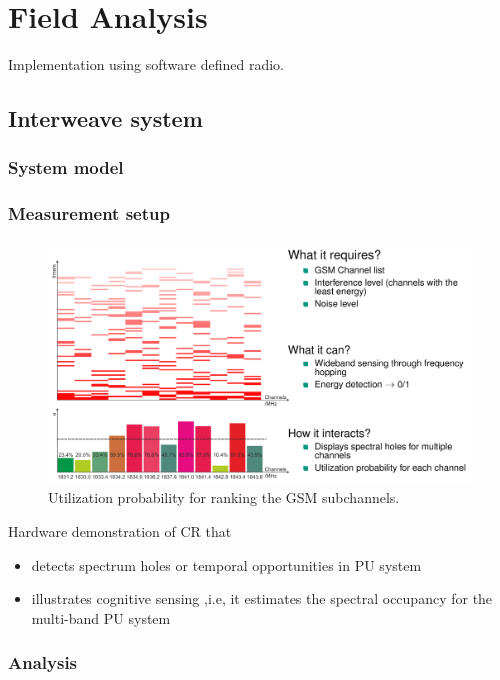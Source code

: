 \chapter{Field Analysis}
\label{chap:Field}
Implementation using software defined radio.
\section{Interweave system}

\subsection{System model}

\subsection{Measurement setup}
\begin{figure}[!t]
        \centering
        \includegraphics[trim=0.0cm 0.0cm 5.28cm 0.0cm,clip=true,width=\columnwidth]{../kapitel05/figures/Interweave_GUI.png}
        \caption{Utilization probability for ranking the GSM subchannels.}
        \label{fig:uti}
\end{figure}
Hardware demonstration \cite{Kaushik_ISWCS} of \ac{CR} that
\begin{itemize}
\item detects spectrum holes or temporal opportunities in \ac{PU} system 
\item illustrates cognitive sensing ,i.e, it estimates the spectral occupancy for the multi-band \ac{PU} system
\end{itemize}

\subsection{Analysis}

